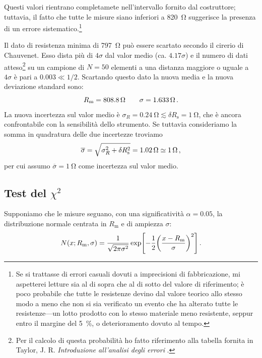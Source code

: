             Questi valori rientrano completamete nell'intervallo fornito dal costruttore; tuttavia, il fatto che tutte le misure siano inferiori a \SI{820}{\ohm} suggerisce la presenza di un errore sistematico.\footnote{Se si trattasse di errori casuali dovuti a imprecisioni di fabbricazione, mi aspetterei letture sia al di sopra che al di sotto del valore di riferimento; è poco probabile che tutte le resistenze devino dal valore teorico allo stesso modo a meno che non si sia verificato un evento che ha alterato tutte le resistenze---un lotto prodotto con lo stesso materiale meno resistente, seppur entro il margine del \SI{5}{\%}, o deterioramento dovuto al tempo.}

            Il dato di resistenza minima di \SI{797}{\ohm} può essere scartato secondo il cirerio di Chauvenet. Esso dista più di $4\sigma$ dal valor medio (ca. $\num{4.17}\sigma$) e il numero di dati atteso\footnote{Per il calcolo di questa probabilità ho fatto riferimento alla tabella fornita in Taylor, J. R. \textit{Introduzione all'analisi degli errori} \cite{Taylor1999-me}.} su un campione di $N = 50$ elementi a una distanza maggiore o uguale a $4\sigma$ è pari a $\num{0.003} \ll 1/2$. Scartando questo dato la nuova media e la nuova deviazione standard sono:
            \begin{equation*}
                R_\text{m} = \SI{808.8}{\ohm}
                \qquad
                \sigma = \SI{1.633}{\ohm}
                \,.
            \end{equation*}
            La nuova incertezza sul valor medio è $\sigma_R = \SI{0.24}{\ohm} \lesssim \delta R_\text{s} = \SI{1}{\ohm}$, che è ancora confrontabile con la sensibilità dello strumento. Se tuttavia consideriamo la somma in quadratura delle due incertezze troviamo
            \begin{equation*}
                \overline{\sigma}
                = \sqrt{\sigma_R^2 + \delta R_\text{s}^2}
                = \SI{1.02}{\ohm}
                \simeq \SI{1}{\ohm}
                \,,
            \end{equation*}
            per cui assumo $\overline{\sigma} = \SI{1}{\ohm}$ come incertezza sul valor medio.

        \subsection{Test del $\chi^2$}
            Supponiamo che le misure seguano, con una significatività $\alpha = \num{0.05}$, la distribuzione normale centrata in $R_\text{m}$ e di ampiezza $\sigma$:
            \begin{equation*}
                N\pqty{x; R_\text{m}, \sigma}
                = \frac{1}{\sqrt{2\pi\sigma^2}} \exp[ -\frac{1}{2}\pqty{\frac{x - R_\text{m}}{\sigma}}^2]
                \myperiod
            \end{equation*}
            
